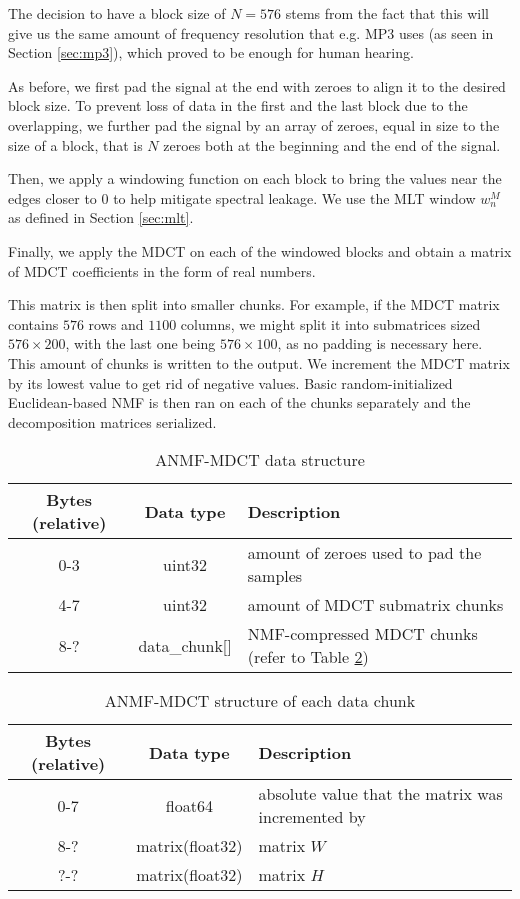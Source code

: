 The decision to have a block size of $N = 576$ stems from the fact that this will give us the same amount of frequency resolution that e.g. MP3 uses (as seen in Section \ref{sec:mp3}), which proved to be enough for human hearing.

As before, we first pad the signal at the end with zeroes to align it to the desired block size. To prevent loss of data in the first and the last block due to the overlapping, we further pad the signal by an array of zeroes, equal in size to the size of a block, that is $N$ zeroes both at the beginning and the end of the signal.

Then, we apply a windowing function on each block to bring the values near the edges closer to $0$ to help mitigate spectral leakage. We use the MLT window $w_n^M$ as defined in Section \ref{sec:mlt}.

Finally, we apply the MDCT on each of the windowed blocks and obtain a matrix of MDCT coefficients in the form of real numbers.

This matrix is then split into smaller chunks. For example, if the MDCT matrix contains $576$ rows and $1100$ columns, we might split it into submatrices sized $576 \times 200$, with the last one being $576 \times 100$, as no padding is necessary here. This amount of chunks is written to the output. We increment the MDCT matrix by its lowest value to get rid of negative values. Basic random-initialized Euclidean-based NMF is then ran on each of the chunks separately and the decomposition matrices serialized.

\begin{table}[htbp]\caption{ANMF-MDCT data structure}
	\label{tab:anmf_mdct_file}
	\centering
	\begin{tabular}{|c|c|l|}
		\hline
		Bytes (relative) & Data type & Description \\ \hline
		0-3 & uint32 & amount of zeroes used to pad the samples \\
		4-7 & uint32 & amount of MDCT submatrix chunks \\
		8-? & data\_chunk[] & NMF-compressed MDCT chunks (refer to Table \ref{tab:anmf_mdct_data}) \\
		\hline
	\end{tabular}
\end{table}

\begin{table}[htbp]\caption{ANMF-MDCT structure of each data chunk}
	\label{tab:anmf_mdct_data}
	\centering
	\begin{tabular}{|c|c|l|}
		\hline
		Bytes (relative) & Data type & Description \\ \hline
		0-7 & float64 & absolute value that the matrix was incremented by \\
		8-? & matrix(float32) & matrix $W$ \\
		?-? & matrix(float32) & matrix $H$ \\
		\hline
	\end{tabular}
\end{table}

